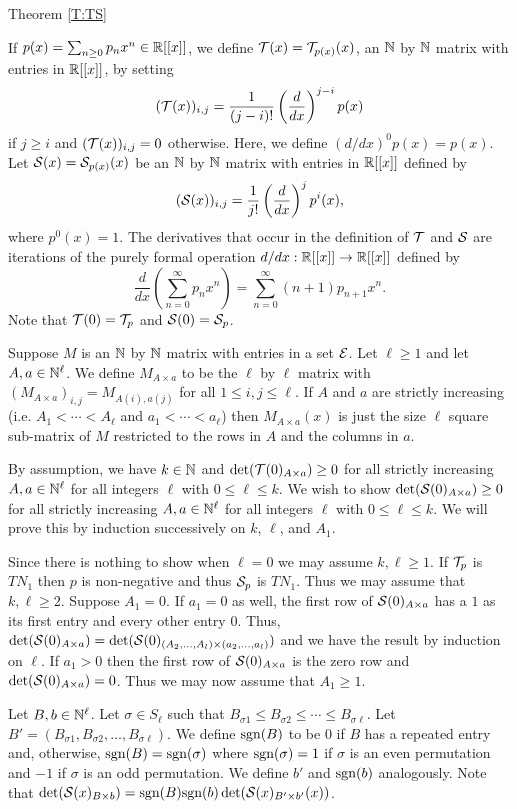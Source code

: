 \documentclass[12pt]{article}
\begin{document}
\begin{proofof}{Theorem \ref{T:TS}}

If $p(x) = \sum_{n \geq 0} p_n x^n \in \mathbb{R}[[x]]$, we define ${\cal T}(x) = {\cal T}_{p(x)}(x)$, an $\mathbb{N}$ by $\mathbb{N}$ matrix with entries in $\mathbb{R}[[x]]$, by setting \[({\cal T}(x))_{i,j} = \frac{1}{(j-i)!}\left(\frac{d}{dx} \right)^{j-i}p(x)\] if $j \geq i$ and $({\cal T}(x))_{i,j} = 0$ otherwise.  Here, we define $(d/dx)^0 p(x) = p(x)$.  Let ${\cal S}(x) = {\cal S}_{p(x)}(x)$ be an $\mathbb{N}$ by $\mathbb{N}$ matrix with entries in $\mathbb{R}[[x]]$ defined by \[({\cal S}(x))_{i,j} = \frac{1}{j!}\left(\frac{d}{dx} \right)^j p^i(x),\] where $p^0(x)=1$. The derivatives that occur in the definition of ${\cal T}$ and ${\cal S}$ are iterations of the purely formal operation $d/dx : \mathbb{R}[[x]] \to \mathbb{R}[[x]]$ defined by \[\frac{d}{dx} \left(\sum_{n=0}^\infty p_n x^n \right) = \sum_{n=0}^\infty (n+1)p_{n+1}x^n.\]  Note that ${\cal T}(0) = {\cal T}_p$ and ${\cal S}(0) ={\cal S}_p$.

Suppose $M$ is an $\mathbb{N}$ by $\mathbb{N}$ matrix with entries in a set ${\cal E}$. Let $\ell \geq 1$ and let $A,a \in \mathbb{N}^\ell$.  We define $M_{A\times a}$ to be the $\ell$ by $\ell$ matrix with $(M_{A\times a})_{i,j} = M_{A(i),a(j)}$ for all $1 \leq i,j \leq \ell$.  If $A$ and $a$ are strictly increasing (i.e. $A_1 < \cdots < A_\ell$ and $a_1 < \cdots < a_\ell$) then $M_{A \times a}(x)$ is just the size $\ell$ square sub-matrix of $M$ restricted to the rows in $A$ and the columns in $a$.

By assumption, we have $k \in \mathbb{N}$ and $\det({\cal T}(0)_{A \times a}) \geq 0$ for all strictly increasing $A,a \in \mathbb{N}^{\ell}$ for all integers $\ell$ with $0 \leq \ell \leq k$.  We wish to show $\det({\cal S}(0)_{A \times a}) \geq 0$ for all strictly increasing $A,a \in \mathbb{N}^\ell$ for all integers $\ell$ with $0 \leq \ell \leq k$.  We will prove this by induction successively on $k$, $\ell$, and $A_1$.  

Since there is nothing to show when $\ell = 0$ we may assume $k, \ell \geq 1$.  If ${\cal T}_p$ is $TN_1$ then $p$ is non-negative and thus ${\cal S}_p$ is $TN_1$.  Thus we may assume that $k, \ell \geq 2$. Suppose $A_1 = 0$. If $a_1 = 0$ as well, the first row of ${\cal S}(0)_{A \times a}$ has a $1$ as its first entry and every other entry $0$. Thus, $\det({\cal S}(0)_{A \times a}) = \det({\cal S}(0)_{(A_2, \ldots, A_l) \times (a_2,\ldots,a_l)})$ and we have the result by induction on $\ell$.  If $a_1 >0$ then the first row of ${\cal S}(0)_{A \times a}$ is the zero row and $\det({\cal S}(0)_{A \times a}) =0$.  Thus we may now assume that $A_1 \geq 1$.

Let $B,b \in \mathbb{N}^\ell$.  Let $\sigma \in S_\ell$ such that $B_{\sigma 1} \leq B_{\sigma 2} \leq \cdots \leq B_{\sigma \ell}$.  Let $B' = (B_{\sigma 1}, B_{\sigma 2}, \ldots, B_{\sigma \ell})$. We define $\mbox{sgn}(B)$ to be $0$ if $B$ has a repeated entry and, otherwise, $\mbox{sgn}(B)= \mbox{sgn}(\sigma)$ where $\mbox{sgn}(\sigma) = 1$ if $\sigma$ is an even permutation and $-1$ if $\sigma$ is an odd permutation.  We define $b'$ and $\mbox{sgn}(b)$ analogously. Note that $\det({\cal S}(x)_{B \times b}) = \mbox{sgn}(B)\mbox{sgn}(b) \det({\cal S}(x)_{B' \times b'}(x))$.


\end{proofof}
\end{document}
